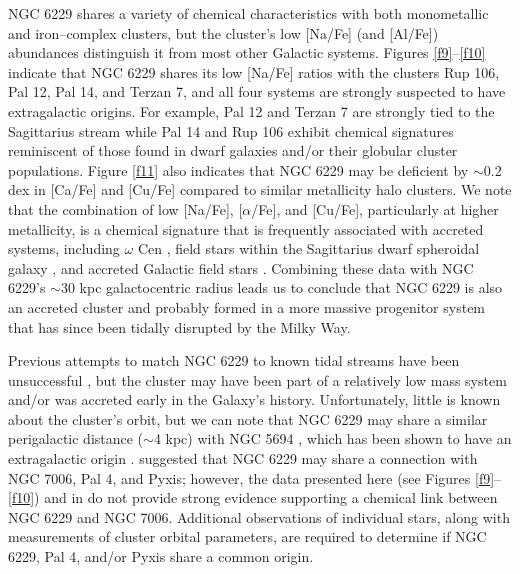 \documentclass[12pt,preprint]{emulateapj}
\begin{document}
NGC 6229 shares a variety of chemical characteristics with both monometallic 
and iron--complex clusters, but the cluster's low [Na/Fe] (and [Al/Fe])
abundances distinguish it from most other Galactic systems.  Figures 
\ref{f9}--\ref{f10} indicate that NGC 6229 shares its low [Na/Fe] ratios with 
the clusters Rup 106, Pal 12, Pal 14, and Terzan 7, and all four systems are 
strongly suspected to have extragalactic origins.  For example, Pal 12 
\citep{Cohen04} and Terzan 7 \citep{Sbordone07} are strongly tied to the 
Sagittarius stream while Pal 14 \citep{Caliskan12} and Rup 106 
\citep{Villanova13} exhibit chemical signatures reminiscent of those found in
dwarf galaxies and/or their globular cluster populations.  Figure \ref{f11} 
also indicates that NGC 6229 may be deficient by $\sim$0.2 dex in [Ca/Fe] and 
[Cu/Fe] compared to similar metallicity halo clusters.  We note that the 
combination of low [Na/Fe], [$\alpha$/Fe], and [Cu/Fe], particularly at higher 
metallicity, is a chemical signature that is frequently associated with 
accreted systems, including $\omega$ Cen \citep{Cunha02,Pancino02}, field 
stars within the Sagittarius dwarf spheroidal galaxy 
\citep[e.g.,][]{McWilliam13}, and accreted Galactic field stars 
\citep[e.g.,][]{Nissen11}.  Combining these data with NGC 6229's $\sim$30 kpc 
galactocentric radius leads us to conclude that NGC 6229 is also an accreted 
cluster and probably formed in a more massive progenitor system that has since 
been tidally disrupted by the Milky Way.

Previous attempts to match NGC 6229 to known tidal streams have been 
unsuccessful \citep[e.g.,][]{Grillmair14}, but the cluster may have been part
of a relatively low mass system and/or was accreted early in the Galaxy's 
history.  Unfortunately, little is known about the cluster's orbit, but we 
can note that NGC 6229 may share a similar perigalactic distance ($\sim$4 kpc)
with NGC 5694 \citep{vandenBergh95}, which has been shown to have an 
extragalactic origin \citep{Mucciarelli13}.  \citet{Palma02} suggested that 
NGC 6229 may share a connection with NGC 7006, Pal 4, and Pyxis; however, the 
data presented here (see Figures \ref{f9}--\ref{f10}) and in \citet{Kraft98}
do not provide strong evidence supporting a chemical link between NGC 6229 and 
NGC 7006.  Additional observations of individual stars, along with measurements
of cluster orbital parameters, are required to determine if NGC 6229, Pal 4,
and/or Pyxis share a common origin.
\end{document}
